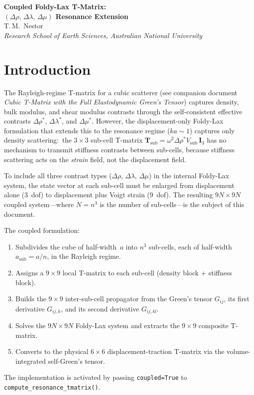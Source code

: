 \documentclass[11pt,a4paper]{article}
\newcommand{\bI}{\mathbf{I}}
\newcommand{\bT}{\mathbf{T}}
\newcommand{\Dlam}{\Delta\lambda}
\newcommand{\Dmu}{\Delta\mu}
\newcommand{\Drho}{\Delta\rho}
\begin{document}
\thispagestyle{plain}
\begin{center}
\vspace*{1em}
{\LARGE\bfseries Coupled Foldy-Lax T-Matrix:\\[0.3em]
$(\Drho,\,\Dlam,\,\Dmu)$ Resonance Extension}\\[1.8em]
{\large T.\,M.\ Nestor}\\[0.5em]
{\itshape Research School of Earth Sciences, Australian National University}\\[2em]
\end{center}

\section{Introduction}

The Rayleigh-regime T-matrix for a cubic scatterer (see companion
document \emph{Cubic T-Matrix with the Full Elastodynamic Green's
Tensor}) captures density, bulk modulus, and shear modulus contrasts
through the self-consistent effective contrasts $\Drho^*$,
$\Dlam^*$, and $\Dmu^*$.  However, the displacement-only Foldy-Lax
formulation that extends this to the resonance regime ($ka \sim 1$)
captures only density scattering:\ the $3 \times 3$ sub-cell T-matrix
$\bT_\text{sub} = \omega^2 \Drho^* V_\text{sub}\,\bI_3$ has no
mechanism to transmit stiffness contrasts between sub-cells, because
stiffness scattering acts on the \emph{strain} field, not the
displacement field.

To include all three contrast types ($\Drho$, $\Dlam$, $\Dmu$) in
the internal Foldy-Lax system, the state vector at each sub-cell must
be enlarged from displacement alone (3~dof) to displacement plus Voigt
strain (9~dof).  The resulting $9N \times 9N$ coupled system---where
$N = n^3$ is the number of sub-cells---is the subject of this
document.

The coupled formulation:
\begin{enumerate}
  \item Subdivides the cube of half-width~$a$ into $n^3$ sub-cells,
    each of half-width $a_\text{sub} = a/n$, in the Rayleigh regime.
  \item Assigns a $9 \times 9$ local T-matrix to each sub-cell
    (density block $+$ stiffness block).
  \item Builds the $9 \times 9$ inter-sub-cell propagator from the
    Green's tensor $G_{ij}$, its first derivative $G_{ij,k}$, and its
    second derivative $G_{ij,kl}$.
  \item Solves the $9N \times 9N$ Foldy-Lax system and extracts the
    $9 \times 9$ composite T-matrix.
  \item Converts to the physical $6 \times 6$ displacement-traction
    T-matrix via the volume-integrated self-Green's tensor.
\end{enumerate}
The implementation is activated by passing \texttt{coupled=True} to
\texttt{compute\_resonance\_tmatrix()}.
\end{document}
